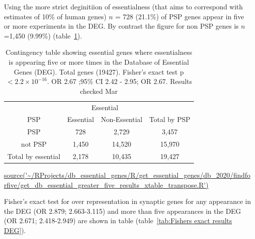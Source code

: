 Using the more strict deginitiion of essentialness (that aims to correspond with estimates of 10\% of human genes) $n$ = 728 (21.1\%) of PSP genes appear in five or more experiments in the DEG. By contrast the figure for non PSP genes is $n$=1,450 (9.99\%) (table~\ref{tab:DEG five or more appearances in contingency table PSP vs not PSP}). 

   \begin{table}
\centering
\begin{tabular}{cccc}
\toprule
& \multicolumn{2}{c}{Essential} & \\
\cmidrule{2-3}
    PSP & Essential &  Non-Essential & Total by PSP\vspace{1mm} \\
\midrule 
PSP      &   728     &     2,729 & 3,457\vspace{1mm}\\
not PSP    &  1,450      &    14,520  & 15,970\vspace{1mm}\\
\midrule
 Total by essential & 2,178 & 10,435 &  19,427\\ 

 
\bottomrule
\end{tabular}
\caption{Contingency table showing essential genes where essentialness is appearing five or more times  in the Database of Essential Genes (DEG). Total genes (19427).  Fisher's exact test p$<2.2\times10^{-16}$. OR 2.67 ;95\% CI 2.42 - 2.95; OR 2.67. Results checked Mar}
\tiny\url{source('~/RProjects/db_essential_genes/R/get_essential_genes/db_2020/findforfive/get_db_essential_greater_five_results_xtable_transpose.R')}  
\label{tab:DEG five or more appearances in contingency table PSP vs not PSP}
\end{table}
    
Fisher's exact test  for over representation in synaptic genes for any appearance in the DEG (OR 2.879; 2.663-3.115) and more than five appearances in the DEG (OR 2.671; 2.418-2.949) are shown in table (table~\ref{tab:Fishers exact results DEG}).

